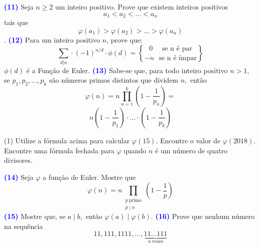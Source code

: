 \documentclass[12pt, a4paper]{article}
\newcommand{\negrito}[1]{\mbox{\boldmath{$#1$}}}
\begin{document}
\newline
\newline
\textcolor{blue}{\bf(11)} Seja $n\geq 2$ um inteiro positivo. Prove que existem inteiros positivos  \[ a_1< a_2< \dots< a_n\] tais que \[ \varphi(a_1)>\varphi(a_2)>\dots>\varphi(a_n)\].
\textcolor{blue}{\bf(12)} Para um inteiro positivo $n$, prove que: $$\sum_{d|n} \cdot \left(-1\right)^{n/d}\cdot\phi(d)={0\ \ \ \ \ \ \text{se n é par} \brace -n \ \ \ \text{se n é ímpar}} $$
$\phi(d)$ é a Função de Euler.
\newline \newline
\textcolor{blue}{\bf(13)} Sabe-se que, para todo inteiro positivo $n > 1,$ se $p_1, p_2, \ldots, p_k$ são números primos distintos que dividem $n,$ então
\[ \varphi(n) = n \prod\limits_{n = 1}^k \left(1 - \frac{1}{p_n}\right) = \]\[n \left(1 - \frac{1}{p_1} \right) \cdot \ldots \cdot \left(1 - \frac{1}{p_k} \right) \]
\begin{tasks}[counter-format={(tsk[a])},label-width=3.6ex, label-format = {\bfseries}, column-sep = {0pt}](1)
\task[\textcolor{Floresta}{$\negrito{(a)} $}] Utilize a fórmula acima para calcular $\varphi(15).$
\task[\textcolor{Floresta}{$\negrito{(b)} $}] Encontre o valor de $\varphi(2018).$
\task[\textcolor{Floresta}{$\negrito{(c)} $}] Encontre uma fórmula fechada para $\varphi$ quando $n$ é um número de quatro divisores.
\end{tasks}
\textcolor{blue}{\bf(14)} Seja $\varphi $ a função de Euler. Mostre que
\[ \varphi(n) = n \prod_{\substack{p \ \mbox{primo} \\ p \mid n }}\left( 1 - \frac{1}{p} \right) \]
\textcolor{blue}{\bf(15)} Mostre que, se $a \mid b,$ então $\varphi (a) \mid \varphi (b)$.
\newline
\newline
\textcolor{blue}{\bf(16)} Prove que nenhum número na sequência 
\[ 11, 111, 1111, \ldots, \underbrace{11 \ldots 111}_{n \ \mbox{vezes}} \]
\end{document}
